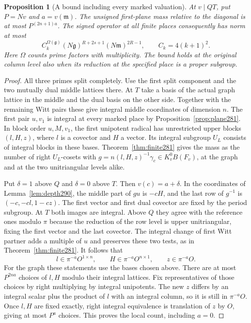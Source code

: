 \documentclass[a4paper,11pt]{article}
\newtheorem{proposition}{Proposition}[section]
\theoremstyle{definition}
\theoremstyle{remark}
\numberwithin{equation}{section}
\begin{document}
\begin{proposition}[A bound including every marked valuation]\leavevmode
\label{prop:marked291}
At \(v\mid QT\), put \(P=Nv\) and \(a=v(\mathfrak m)\).
The unsigned first-plane mass relative to the diagonal is
at most \(P^{(2n+1)a}\). The signed operator at all finite
places consequently has norm at most
\[
    C_k^{\Omega(\mathfrak g)}
       (N\mathfrak g)^{R+2s+1}(N\mathfrak m)^{2R-1},
       \qquad C_k=4(k+1)^2 .
\]
Here \(\Omega\) counts prime factors with multiplicity. The
bound holds at the original column level also when its
reduction at the specified place is a proper subgroup.
\end{proposition}
\begin{proof}
All three primes split completely. Use the first split
component and the two mutually dual middle lattices there.
At \(T\) take a basis of the actual graph lattice in the
middle and the dual basis on the other side. Together
with the remaining Witt pairs these give integral middle
coordinates of dimension \(n\). The first pair \(u,v_1\)
is integral at every marked place by
Proposition~\ref{prop:plane281}. In block order \(u,M,v_1\),
the first unipotent radical has unrestricted upper blocks
\((l,H,z)\), where \(l\) is a covector and \(H\) a vector.
Its integral subgroup \(U_L\) consists of integral blocks
in these bases. Theorem~\ref{thm:finite281} gives the mass
as the number of right \(U_L\)-cosets with
\(g=n(l,H,z)^{-1}\gamma_c\in K_v^0 B(F_v)\), at the graph
and at the two unitriangular levels alike.

Put \(\delta=1\) above \(Q\) and \(\delta=0\) above \(T\).
Then \(v(c)=a+\delta\). In the coordinates of
Lemma~\ref{lem:depth290}, the middle part of \(gu\) is
\(-cH\), and the last row of \(g^{-1}\) is
\((-c,-cl,1-cz)\). The first vector and first dual covector
are fixed by the period subgroup. At \(T\) both images
are integral. Above \(Q\) they agree with the reference
ones modulo \(\pi\) because the reduction of the row level is
upper unitriangular, fixing the first vector and the last
covector. The integral change of first Witt partner adds
a multiple of \(u\) and preserves these two tests, as in
Theorem~\ref{thm:finite281}. It follows that
\[
       l\in\pi^{-a}O^{1\times n},\qquad
       H\in\pi^{-a}O^{n\times1},\qquad z\in\pi^{-a}O .
\]
For the graph these statements use the bases chosen above.
There are at most \(P^{2na}\) choices of \(l,H\) modulo
their integral lattices. Fix representatives of those choices
by right multiplying by integral unipotents. The new \(z\)
differs by an integral scalar plus the product of \(l\)
with an integral column, so it is still in \(\pi^{-a}O\).
Once \(l,H\) are fixed exactly, right integral equivalence
is translation of \(z\) by \(O\), giving at most \(P^a\)
choices. This proves the local count, including \(a=0\).


\end{proof}
\end{document}
